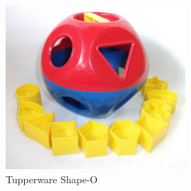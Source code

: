 \documentclass[include/preamble.tex]{subfiles}
\begin{document}
\begin{frame}
  \begin{figure}
    \begin{center}
      \includegraphics[width=0.6\textwidth]{images/tupperware-shape-o.jpg}
    \end{center}
    \caption{Tupperware Shape-O}
  \end{figure}
\end{frame}
\end{document}
